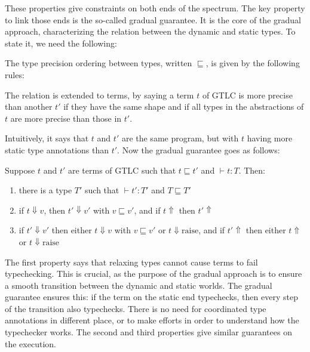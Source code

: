 \documentclass{kaobook}
\renewcommand{\mathtt}{\mathrm}
\newcommand{\pre}{\sqsubseteq}
\DeclareMathOperator{\?}{?}
\newcommand{\bool}{\mathbf{B}}
\newcommand{\nat}{\mathbf{N}}
\newcommand{\rai}{\mathtt{raise}}
\begin{document}
{These properties give constraints on both ends of the spectrum. The key property to link those ends is the so-called gradual guarantee. It is the core of the gradual approach, characterizing the relation between the dynamic and static types. To state it, we need the following:

\begin{df}
	The type precision ordering between types, written $\pre$, is given by the following rules:
	
	The relation is extended to terms, by saying a term $t$ of GTLC is more precise than another $t'$ if they have the same shape and if all types in the abstractions of $t$ are more precise than those in $t'$.
\end{df}

Intuitively, it says that $t$ and $t'$ are the same program, but with $t$ having more static type annotations than $t'$. Now the gradual guarantee goes as follows:

\begin{prop}
	Suppose $t$ and $t'$ are terms of GTLC such that $t \pre t'$ and $\vdash t : T$. Then:
	\begin{enumerate}
		\item there is a type $T'$ such that $\vdash t' : T'$ and $T \pre T'$
		\item if $t \Downarrow v$, then $t' \Downarrow v'$ with $v \pre v'$, and if $t \Uparrow$ then $t' \Uparrow$
		\item if $t' \Downarrow v'$ then either $t \Downarrow v$ with $v \pre v'$ or $t \Downarrow \rai$, and if $t' \Uparrow$ then either $t \Uparrow$ or $t \Downarrow \rai$
	\end{enumerate}
\end{prop}

The first property says that relaxing types cannot cause terms to fail typechecking. This is crucial, as the purpose of the gradual approach is to ensure a smooth transition between the dynamic and static worlds. The gradual guarantee ensures this: if the term on the static end typechecks, then every step of the transition also typechecks. There is no need for coordinated type annotations in different place, or to make efforts in order to understand how the typechecker works.
The second and third properties give similar guarantees on the execution.

}
\end{document}
